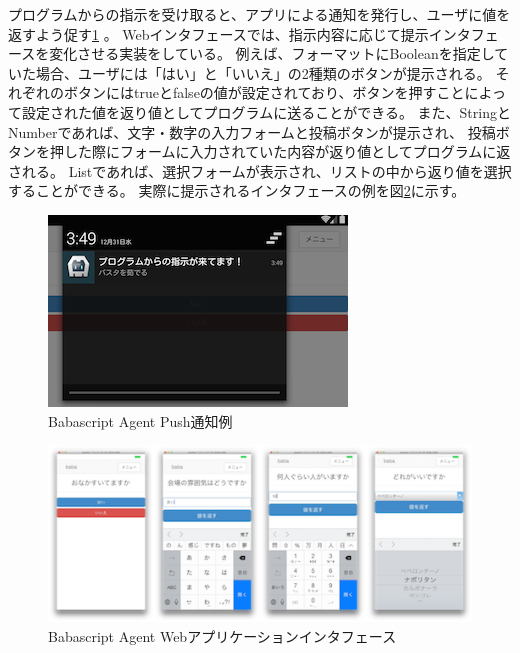 プログラムからの指示を受け取ると、アプリによる通知を発行し、ユーザに値を返すよう促す\ref{fig:client-push-notification}
。
Webインタフェースでは、指示内容に応じて提示インタフェースを変化させる実装をしている。
例えば、フォーマットにBooleanを指定していた場合、ユーザには「はい」と「いいえ」の2種類のボタンが提示される。
それぞれのボタンにはtrueとfalseの値が設定されており、ボタンを押すことによって設定された値を返り値としてプログラムに送ることができる。
また、StringとNumberであれば、文字・数字の入力フォームと投稿ボタンが提示され、
投稿ボタンを押した際にフォームに入力されていた内容が返り値としてプログラムに返される。
Listであれば、選択フォームが表示され、リストの中から返り値を選択することができる。
実際に提示されるインタフェースの例を図\ref{fig:client_format_list}に示す。

\begin{figure}[htbp]
  \begin{center}
  \includegraphics[width=.7\linewidth,bb=0 0 300 192]{images/client-push-notification.png}
  \end{center}
  \caption{Babascript Agent Push通知例}
  \label{fig:client-push-notification}
\end{figure}

\begin{figure}[htbp]
  \begin{center}
  \includegraphics[width=.8\linewidth,bb=0 0 500 209]{images/client_format_list.png}
  \end{center}
  \caption{Babascript Agent Webアプリケーションインタフェース}
  \label{fig:client_format_list}
\end{figure}

